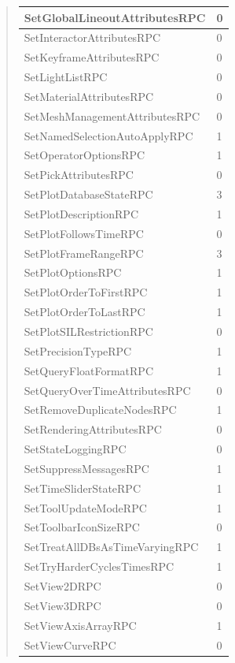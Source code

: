 \documentclass[letterpaper,10pt,english]{sphinxmanual}
\begin{document}
\begin{quote}
\begin{longtable}{|l|l|}
\hline
SetGlobalLineoutAttributesRPC
 & 
0
\\
\hline
SetInteractorAttributesRPC
 & 
0
\\
\hline
SetKeyframeAttributesRPC
 & 
0
\\
\hline
SetLightListRPC
 & 
0
\\
\hline
SetMaterialAttributesRPC
 & 
0
\\
\hline
SetMeshManagementAttributesRPC
 & 
0
\\
\hline
SetNamedSelectionAutoApplyRPC
 & 
1
\\
\hline
SetOperatorOptionsRPC
 & 
1
\\
\hline
SetPickAttributesRPC
 & 
0
\\
\hline
SetPlotDatabaseStateRPC
 & 
3
\\
\hline
SetPlotDescriptionRPC
 & 
1
\\
\hline
SetPlotFollowsTimeRPC
 & 
0
\\
\hline
SetPlotFrameRangeRPC
 & 
3
\\
\hline
SetPlotOptionsRPC
 & 
1
\\
\hline
SetPlotOrderToFirstRPC
 & 
1
\\
\hline
SetPlotOrderToLastRPC
 & 
1
\\
\hline
SetPlotSILRestrictionRPC
 & 
0
\\
\hline
SetPrecisionTypeRPC
 & 
1
\\
\hline
SetQueryFloatFormatRPC
 & 
1
\\
\hline
SetQueryOverTimeAttributesRPC
 & 
0
\\
\hline
SetRemoveDuplicateNodesRPC
 & 
1
\\
\hline
SetRenderingAttributesRPC
 & 
0
\\
\hline
SetStateLoggingRPC
 & 
0
\\
\hline
SetSuppressMessagesRPC
 & 
1
\\
\hline
SetTimeSliderStateRPC
 & 
1
\\
\hline
SetToolUpdateModeRPC
 & 
1
\\
\hline
SetToolbarIconSizeRPC
 & 
0
\\
\hline
SetTreatAllDBsAsTimeVaryingRPC
 & 
1
\\
\hline
SetTryHarderCyclesTimesRPC
 & 
1
\\
\hline
SetView2DRPC
 & 
0
\\
\hline
SetView3DRPC
 & 
0
\\
\hline
SetViewAxisArrayRPC
 & 
1
\\
\hline
SetViewCurveRPC
 & 
0
\\

\end{longtable}
\end{quote}
\end{document}
